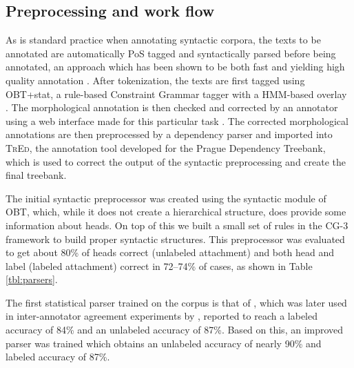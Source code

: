 \documentclass[11pt,a4paper]{article}
\let\app=\textsc
\begin{document}
\subsection{Preprocessing and work flow}
As is standard practice when annotating syntactic corpora, the texts to be
annotated are automatically PoS tagged and syntactically parsed before being
annotated, an approach which has been shown to be both fast and yielding
high quality annotation \cite{Mar:San:Mar:93,For:Sag:10,Skjaerholt:13}.
After tokenization, the texts are first tagged using OBT+stat,
a rule-based Constraint Grammar tagger with a HMM-based overlay \cite{Johannessen:etal:12}.
 The morphological annotation is then checked and corrected by an annotator using a web interface made for this
particular task \cite{Lyn:13}. The corrected morphological annotations are
then preprocessed by a dependency parser and imported into \app{TrEd}, the
annotation tool developed for the Prague Dependency Treebank, which is used to
correct the output of the syntactic preprocessing and create the final
treebank.

The initial syntactic preprocessor was created using
the syntactic module of OBT, which, while it does not create a hierarchical
structure, does provide some information about heads. On top of this we built
a small set of rules in the CG-3 framework \cite{Did:2013} to build proper
syntactic structures. This preprocessor was evaluated to get about 80\% of
heads correct (unlabeled attachment) and both head and label (labeled
attachment) correct in 72--74\% of cases, as shown in Table \ref{tbl:parsers}.

The first statistical parser trained on the corpus is that of
, which was later used in inter-annotator agreement
experiments by , reported to reach a labeled accuracy of
84\% and an unlabeled accuracy of 87\%. Based on this, an improved parser was
trained which obtains an unlabeled accuracy of nearly 90\% and labeled
accuracy of 87\%.
\end{document}
